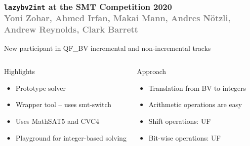 \documentclass[t,aspectratio=43,9pt,bookmarks=false,dvipsnames,table]{beamer}
\newcommand{\lazybvtoint}{\texttt{lazybv2int}\xspace}
\newcommand{\qfbv}{QF\_BV\xspace}
\newcommand{\msat}{MathSAT5\xspace}
\newcommand{\cvcfour}{CVC4\xspace}
\newcommand{\smtswitch}{smt-switch\xspace}
\begin{document}
\newcommand{\gray}[1]{\textcolor{gray}{#1}}

\begin{frame}[t]
  \frametitle{\lazybvtoint at the SMT Competition 2020\\
    \footnotesize\gray{
      Yoni Zohar,
      Ahmed Irfan,
      Makai Mann,
      Andres N\"otzli,
      Andrew Reynolds,
      Clark Barrett
}}

  \small

 \begin{center}
New participant in \qfbv incremental and non-incremental tracks
\end{center}

  \begin{block}{}
  \begin{columns}
  \begin{alertblock}{Highlights}
  \begin{itemize}
  \item Prototype solver
  \item Wrapper tool -- uses \smtswitch
    \item Uses \msat and \cvcfour
    \item Playground for integer-based solving
  \end{itemize}
  \end{alertblock}
  \begin{alertblock}{Approach}
      \begin{itemize}
  \item Translation from BV to integers
        \item Arithmetic operations are easy
        \item Shift operations: UF 
        \item Bit-wise operations: UF
      \end{itemize}
  \end{alertblock}
  \end{columns}
  \end{block}

\vspace{-1em}
  

\end{frame}
\end{document}
